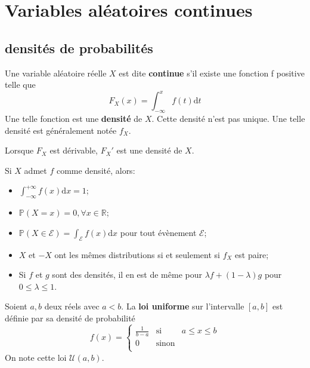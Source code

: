 \documentclass[]{book}
\theoremstyle{definition}
\theoremstyle{definition}
\theoremstyle{definition}
\theoremstyle{remark}
\let\BeginKnitrBlock\begin \let\EndKnitrBlock\end
\begin{document}
\hypertarget{variables-aluxe9atoires-continues}{%
\chapter{Variables aléatoires continues}\label{variables-aluxe9atoires-continues}}

\hypertarget{densituxe9s-de-probabilituxe9s}{%
\section{densités de probabilités}\label{densituxe9s-de-probabilituxe9s}}

\BeginKnitrBlock{definition}
\protect\hypertarget{def:unnamed-chunk-37}{}{\label{def:unnamed-chunk-37} }Une variable aléatoire réelle \(X\) est dite \textbf{continue} s'il existe une fonction f positive telle que
\[F_X(x) = \int_{-\infty}^x f(t) \mbox{d}t\]
Une telle fonction est une \textbf{densité} de \(X\). Cette densité n'est pas unique.
Une telle densité est généralement notée \(f_X\).

Lorsque \(F_X\) est dérivable, \(F_X'\) est une densité de \(X\).
\EndKnitrBlock{definition}

\BeginKnitrBlock{lemma}
\protect\hypertarget{lem:unnamed-chunk-38}{}{\label{lem:unnamed-chunk-38} }Si \(X\) admet \(f\) comme densité, alors:

\begin{itemize}
\item
  \(\int_{-\infty}^{+\infty} f(x) \mbox{d}x = 1\);
\item
  \(\mathbb{P}(X=x)=0, \forall x \in \mathbb{R}\);
\item
  \(\mathbb{P}(X \in \mathcal{E}) = \int_{\mathcal{E}} f(x) \mbox{d}x\) pour tout évènement \(\mathcal{E}\);
\item
  \(X\) et \(-X\) ont les mêmes distributions si et seulement si \(f_X\) est paire;
\item
  Si \(f\) et \(g\) sont des densités, il en est de même pour \(\lambda f + (1-\lambda)g\) pour \(0 \leq \lambda \leq 1\).
\end{itemize}
\EndKnitrBlock{lemma}

\BeginKnitrBlock{example}
\protect\hypertarget{exm:unnamed-chunk-39}{}{\label{exm:unnamed-chunk-39} }Soient \(a,b\) deux réels avec \(a<b\). La \textbf{loi uniforme} sur l'intervalle \([a,b]\) est définie par sa densité de probabilité
\[
f(x) = \left\lbrace
\begin{array}{ccc}
\frac{1}{b-a}  & \mbox{si} & a \leq x \leq b\\
0 & \mbox{sinon} &\\
\end{array}\right.
\]
On note cette loi \(\mathcal{U}(a,b)\).
\EndKnitrBlock{example}
\end{document}
